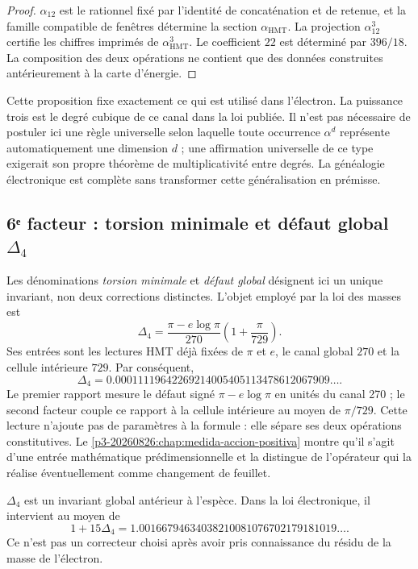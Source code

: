 \begin{proof}
\(\alpha_{12}\) est le rationnel fixé par l'identité de concaténation et de
retenue, et la famille compatible de fenêtres détermine la section
\(\alpha_{\mathrm{HMT}}\). La projection \(\alpha_{12}^3\) certifie les
chiffres imprimés de \(\alpha_{\mathrm{HMT}}^3\).
Le coefficient \(22\) est déterminé par \(396/18\). La composition des
deux opérations ne contient que des données construites antérieurement à la
carte d'énergie.
\end{proof}

Cette proposition fixe exactement ce qui est utilisé dans l'électron. La puissance
trois est le degré cubique de ce canal dans la loi publiée. Il n'est pas nécessaire
de postuler ici une règle universelle selon laquelle toute occurrence
\(\alpha^d\) représente automatiquement une dimension \(d\) ; une
affirmation universelle de ce type exigerait son propre théorème de
multiplicativité entre degrés. La généalogie électronique est complète
sans transformer cette généralisation en prémisse.

\subsection{6ᵉ facteur : torsion minimale et défaut global \(\Delta_4\)}

Les dénominations \emph{torsion minimale} et \emph{défaut global}
désignent ici un unique invariant, non deux corrections distinctes. L'objet
employé par la loi des masses est
\begin{equation}
 \label{p12-83-c15-s2:eq:delta4-electron-rev6}
 \boxed{
 \Delta_4
 =
 \frac{\pi-e\log\pi}{270}
 \left(1+\frac{\pi}{729}\right).}
\end{equation}
Ses entrées sont les lectures HMT déjà fixées de \(\pi\) et \(e\), le canal
global \(270\) et la cellule intérieure \(729\). Par conséquent,
\[
 \Delta_4
 =
 0.00011119642269214005405113478612067909\ldots.
\]
Le premier rapport mesure le défaut signé
\(\pi-e\log\pi\) en unités du canal 270 ; le second facteur couple ce
rapport à la cellule intérieure au moyen de \(\pi/729\). Cette lecture n'ajoute pas de
paramètres à la formule : elle sépare ses deux opérations constitutives.
Le \cref{p3-20260826:chap:medida-accion-positiva} montre qu'il s'agit d'une entrée mathématique
prédimensionnelle et la distingue de l'opérateur qui la réalise éventuellement
comme changement de feuillet.

\begin{proposition}
\label{p12-83-c15-s2:prop:delta4-global-electron-rev6}
\(\Delta_4\) est un invariant global antérieur à l'espèce. Dans la loi
électronique, il intervient au moyen de
\[
 1+15\Delta_4
 =
 1.00166794634038210081076702179181019\ldots.
\]
Ce n'est pas un correcteur choisi après avoir pris connaissance du résidu de la masse de
l'électron.
\end{proposition}

